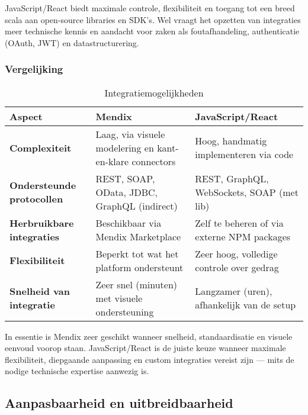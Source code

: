 JavaScript/React biedt maximale controle, flexibiliteit en toegang tot een breed scala aan open-source libraries en SDK’s. Wel vraagt het opzetten van integraties meer technische kennis en aandacht voor zaken als foutafhandeling, authenticatie (OAuth, JWT) en datastructurering.

\subsubsection{Vergelijking}

\begin{table}[H]
    \centering
    \begin{tabular}{ |p{3cm}|p{5.5cm}|p{5.5cm}|}
        \hline
        \textbf{Aspect} & \textbf{Mendix} & \textbf{JavaScript/React}\\
        \hline
        \textbf{Complexiteit}  & Laag, via visuele modelering en kant-en-klare connectors & Hoog, handmatig implementeren via code  \\
        \hline
        \textbf{Ondersteunde protocollen} & REST, SOAP, OData, JDBC, GraphQL (indirect) & REST, GraphQL, WebSockets, SOAP (met lib) \\
        \hline
        \textbf{Herbruikbare integraties}  & Beschikbaar via Mendix Marketplace & 	Zelf te beheren of via externe NPM packages \\
        \hline
        \textbf{Flexibiliteit}  & 	Beperkt tot wat het platform ondersteunt & Zeer hoog, volledige controle over gedrag \\
        \hline                       
        \textbf{Snelheid van integratie}  & 	Zeer snel (minuten) met visuele ondersteuning & Langzamer (uren), afhankelijk van de setup \\
        \hline
    \end{tabular}
    \caption[\centering Integratiemogelijkheden]{\label{tab:integratiemogelijkheden}Integratiemogelijkheden}
\end{table}
In essentie is Mendix zeer geschikt wanneer snelheid, standaardisatie en visuele eenvoud voorop staan. JavaScript/React is de juiste keuze wanneer maximale flexibiliteit, diepgaande aanpassing en custom integraties vereist zijn — mits de nodige technische expertise aanwezig is.


\subsection{Aanpasbaarheid en uitbreidbaarheid}

